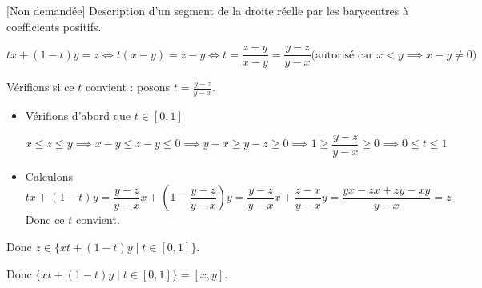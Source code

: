 \documentclass{article}
\renewenvironment{question_kholle}[2][ ]
{
	\subsection{\texorpdfstring{#2}{}}
	\notblank{#1}
	{
		\noindent #1
		\bigbreak
	}
	{}
	\begin{proof}
}
{
	\end{proof}
}
\begin{document}
\begin{question_kholle}[{
				Soient $(x, y) \in \R^2$ tels que
				$x \leqslant y$. $$[x, y] = \{z \in
					\R \mid x \leqslant z \leqslant y
					\} = \{tx + (1-t)y \mid t \in [0, 1]\}$$
			}]{[Non demandée] Description d'un
		segment de la droite réelle par les
		barycentres à coefficients positifs.}
\begin{itemize}[label=$\star$]
		      $$
			      tx + (1-t)y = z \iff t(x-y) =
			      z-y \iff t = \frac{z-y}{x-y}
			      = \frac{y-z}{y-x} \text{
				      (autorisé car }x<y \implies
			      x-y \neq 0 \text{)}
		      $$

		      Vérifions si ce $t$ convient
		      : posons $t = \frac{y-z}{y-x}$.
		      \begin{itemize}[label=$\bullet$]
			      \item Vérifions d'abord que
			            $t \in [0,1]$

			            $$
				            x\leqslant z \leqslant y
				            \implies x-y \leqslant
				            z-y \leqslant 0 \implies
				            y-x\geqslant y-z
				            \geqslant 0 \implies 1
				            \geqslant \frac{y-z}{y-x}
				            \geqslant 0 \implies
				            0\leqslant t \leqslant 1
			            $$
			      \item Calculons
			            $$
				            tx+(1-t)y =
				            \frac{y-z}{y-x} x +
				            \left( 1- \frac{y-z}{y-x}
				            \right)y =
				            \frac{y-z}{y-x}x +
				            \frac{z-x}{y-x}y =
				            \frac{yx-zx+zy - xy}{y-x} =  z
			            $$
			            Donc ce $t$ convient.
		      \end{itemize}
		      Donc $z \in \{ xt+(1-t)y \mid
			      t \in [0, 1] \}$.
	\end{itemize}
	Donc $\{ xt+(1-t)y \mid t \in [0,
			1] \} = [x, y]$.
\end{question_kholle}
\end{document}
